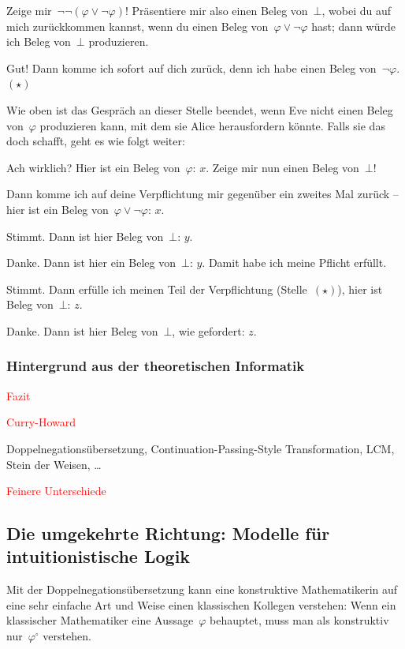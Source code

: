\documentclass[a4paper,ngerman,12pt]{scrartcl}
\theoremstyle{definition}
\theoremstyle{plain}
\theoremstyle{remark}
\renewcommand{\_}{\mathpunct{.}\,}
\newcommand{\?}{\,{:}\,}
\newcommand{\XXX}[1]{\textcolor{red}{#1}}
\newcommand{\Alice}{\item[Alice]}
\newcommand{\Eve}{\item[Eve]}
\newenvironment{dialogue}[1]{%
  \begin{list}{}{%
    \settowidth{\labelwidth}{\qquad\emph{#1:}}
    \setlength{\labelsep}{0.3cm}
    \setlength{\leftmargin}{\labelwidth}
    \addtolength{\leftmargin}{\labelsep}
    \setlength{\rightmargin}{0pt}
    \setlength{\parsep}{0.5ex plus 0.2ex minus 0.1ex}
    \setlength{\itemsep}{0 ex plus 0.2ex}
    \renewcommand{\makelabel}[1]{\qquad\emph{##1:}\hfil}
    }
}{\end{list}}
\begin{document}
\begin{dialogue}{Alice}
\Eve Zeige mir~$\neg\neg(\varphi \vee \neg\varphi)$!
Präsentiere mir also einen Beleg von~$\bot$, wobei du auf mich zurückkommen
kannst, wenn du einen Beleg von~$\varphi \vee \neg\varphi$ hast; dann
würde ich Beleg von~$\bot$ produzieren.
\Alice Gut! Dann komme ich sofort auf dich zurück, denn ich habe einen Beleg
von~$\neg\varphi$. $(\star)$
\end{dialogue}

Wie oben ist das Gespräch an dieser Stelle beendet, wenn Eve nicht einen Beleg
von~$\varphi$ produzieren kann, mit dem sie Alice herausfordern könnte. Falls
sie das doch schafft, geht es wie folgt weiter:

\begin{dialogue}{Alice}
\Eve Ach wirklich? Hier ist ein Beleg von~$\varphi$: $x$. Zeige mir nun einen
Beleg von~$\bot$!
\Alice Dann komme ich auf deine Verpflichtung mir gegenüber ein zweites Mal
zurück -- hier ist ein Beleg von~$\varphi \vee \neg\varphi$: $x$.
\Eve Stimmt. Dann ist hier Beleg von~$\bot$: $y$.
\Alice Danke. Dann ist hier ein Beleg von~$\bot$: $y$. Damit habe ich meine
Pflicht erfüllt.
\Eve Stimmt. Dann erfülle ich meinen Teil der Verpflichtung (Stelle~$(\star)$),
hier ist Beleg von~$\bot$: $z$.
\Alice Danke. Dann ist hier Beleg von~$\bot$, wie gefordert: $z$.
\end{dialogue}


\subsubsection*{Hintergrund aus der theoretischen Informatik}



\XXX{Fazit}

\XXX{Curry-Howard}

Doppelnegationsübersetzung, Continuation-Passing-Style Transformation,
LCM, Stein der Weisen, \ldots

\XXX{Feinere Unterschiede}


\subsection{Die umgekehrte Richtung: Modelle für intuitionistische Logik}

Mit der Doppelnegationsübersetzung kann eine konstruktive Mathematikerin auf
eine sehr einfache Art und Weise einen klassischen Kollegen verstehen: Wenn ein
klassischer Mathematiker eine Aussage~$\varphi$ behauptet, muss man als
konstruktiv nur~$\varphi^\circ$ verstehen.
\end{document}
